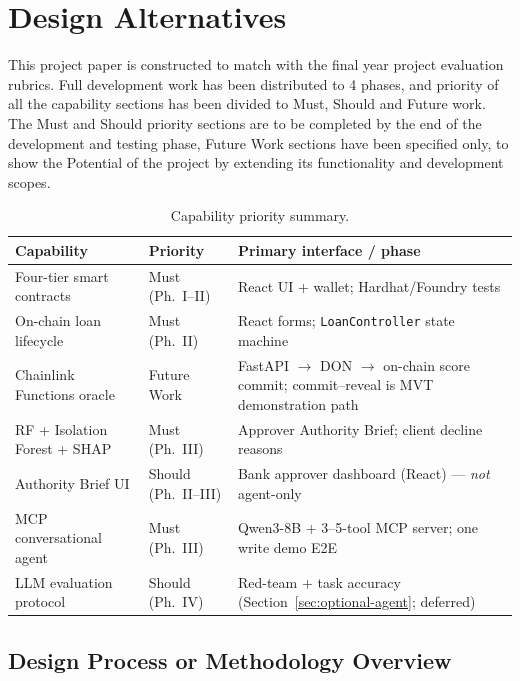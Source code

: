 \documentclass[12pt,a4paper]{report}
\newcommand{\tableheadcolor}{\rowcolor{TableHeadBg}}
\begin{document}
\chapter{Design Alternatives}
\label{ch:methodology}
\label{ch:design-alternatives}

This project paper is constructed to match with the final year project evaluation rubrics. Full development work has been distributed to 4 phases, and priority of all the capability sections has been divided to Must, Should and Future work. The Must and Should priority sections are to be completed by the end of the development and testing phase, Future Work sections have been specified only, to show the Potential of the project by extending its functionality and development scopes.

\begin{table}[H]
\centering
\caption[Capability priority summary]{Capability priority summary.}
\label{tab:capability-priority}
\begin{tabular}{p{3.2cm}p{2.2cm}p{7.8cm}}
\toprule
\tableheadcolor
\textbf{Capability} & \textbf{Priority} & \textbf{Primary interface / phase} \\
\midrule
Four-tier smart contracts & Must (Ph.~I--II) & React UI + wallet; Hardhat/Foundry tests \\
On-chain loan lifecycle & Must (Ph.~II) & React forms; \texttt{LoanController} state machine \\
Chainlink Functions oracle & Future Work & FastAPI $\to$ DON $\to$ on-chain score commit; commit--reveal is MVT demonstration path \\
RF + Isolation Forest + SHAP & Must (Ph.~III) & Approver Authority Brief; client decline reasons \\
Authority Brief UI & Should (Ph.~II--III) & Bank approver dashboard (React) --- \textit{not} agent-only \\
MCP conversational agent & Must (Ph.~III) & Qwen3-8B + 3--5-tool MCP server; one write demo E2E \\
LLM evaluation protocol & Should (Ph.~IV) & Red-team + task accuracy (Section~\ref{sec:optional-agent}; deferred) \\
\bottomrule
\end{tabular}
\end{table}


\section{Design Process or Methodology Overview}
\label{sec:design-process-overview}
\end{document}
